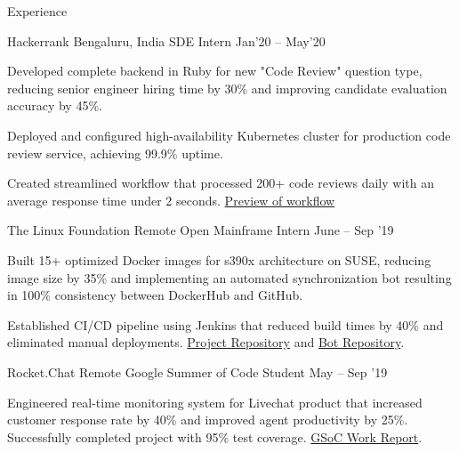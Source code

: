\documentclass{resume} %
\begin{document}
\begin{rSection}{Experience}
  \begin{rWorkSection}{Hackerrank}
                     {Bengaluru, India}
                     {SDE Intern}
                     {Jan'20 -- May'20} {
    \item Developed complete backend in Ruby for new "Code Review" question type, reducing senior engineer hiring time by 30\% and improving candidate evaluation accuracy by 45\%.
    \item Deployed and configured high-availability Kubernetes cluster for production code review service, achieving 99.9\% uptime.
    \item Created streamlined workflow that processed 200+ code reviews daily with an average response time under 2 seconds. \href{https://drive.google.com/file/d/1o1cM7VUnvcKaShnM1XLyEChmaIrFrKEh/view}{Preview of workflow}
  }
  \end{rWorkSection}

  \begin{rWorkSection}{The Linux Foundation}
                           {Remote}
                           {Open Mainframe Intern}
                           {June -- Sep '19}
  {
    \item Built 15+ optimized Docker images for s390x architecture on SUSE, reducing image size by 35\% and implementing an automated synchronization bot resulting in 100\% consistency between DockerHub and GitHub.
    \item Established CI/CD pipeline using Jenkins that reduced build times by 40\% and eliminated manual deployments. \href{https://github.com/openmainframeproject-internship/DockerHub-Development-Stacks/}{Project Repository} and \href{https://github.com/knrt10/docker-hub-development-stacks-bot/}{Bot Repository}.
  }                         
  \end{rWorkSection}

  \begin{rWorkSection}{Rocket.Chat}
                      {Remote}
                      {Google Summer of Code Student}
                      {May -- Sep '19}
  {
    \item Engineered real-time monitoring system for Livechat product that increased customer response rate by 40\% and improved agent productivity by 25\%. Successfully completed project with 95\% test coverage. \href{http://bit.ly/2kGqWt2}{GSoC Work Report}.
  }
  \end{rWorkSection}


\end{rSection}
\end{document}
